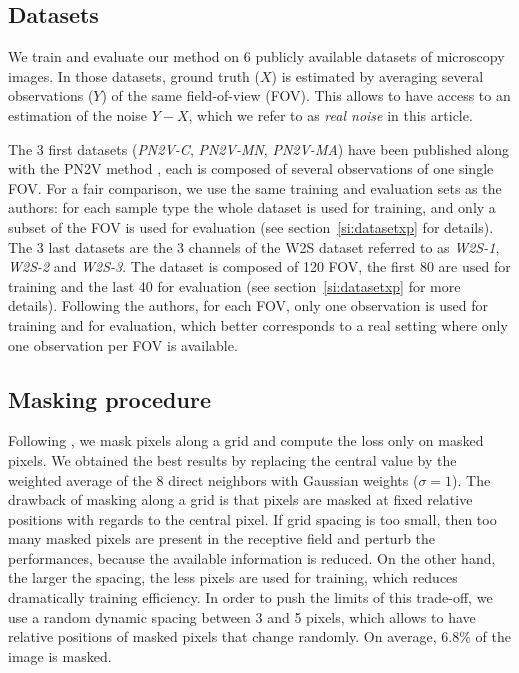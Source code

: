 \documentclass{article}
\begin{document}

\subsection{Datasets}
\label{sec:datasets}
We train and evaluate our method on 6 publicly available datasets of microscopy images. In those datasets, ground truth ($X$) is estimated by averaging several observations ($Y$) of the same field-of-view (FOV).
This allows to have access to an estimation of the noise $Y-X$, which we refer to as \textit{real noise} in this article.

The 3 first datasets (\emph{PN2V-C}, \emph{PN2V-MN}, \emph{PN2V-MA}) have been published along with the PN2V method \cite{krull2019probabilistic}, each is composed of several observations of one single FOV.
For a fair comparison, we use the same training and evaluation sets as the authors: for each sample type the whole dataset is used for training, and only a subset of the FOV is used for evaluation (see section~\ref{si:datasetxp} for details).
The 3 last datasets are the 3 channels of the W2S dataset \cite{zhou2020w2s} referred to as \emph{W2S-1}, \emph{W2S-2} and \emph{W2S-3}.
The dataset is composed of 120 FOV, the first 80 are used for training and the last 40 for evaluation (see section~\ref{si:datasetxp} for more details).
Following the authors, for each FOV, only one observation is used for training and for evaluation, which better corresponds to a real setting where only one observation per FOV is available.

\subsection{Masking procedure}
\label{sec:masking}
Following \cite{batson2019noise2self}, we mask pixels along a grid and compute the loss only on masked pixels.
We obtained the best results by replacing the central value by the weighted average of the 8 direct neighbors with Gaussian weights ($\sigma=1$).
The drawback of masking along a grid is that pixels are masked at fixed relative positions with regards to the central pixel.
If grid spacing is too small, then too many masked pixels are present in the receptive field and perturb the performances, because the available information is reduced.
On the other hand, the larger the spacing, the less pixels are used for training, which reduces dramatically training efficiency.
In order to push the limits of this trade-off, we use a random dynamic spacing between 3 and 5 pixels, which allows to have relative positions of masked pixels that change randomly.
On average, $6.8\%$ of the image is masked.
\end{document}

